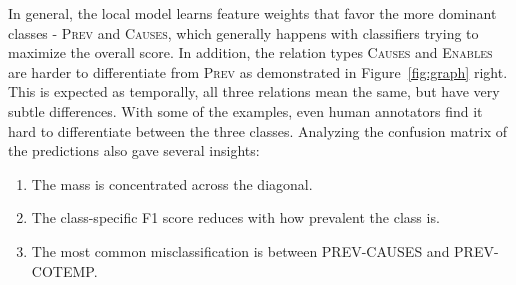 In general, the local model learns feature weights that favor the more dominant classes - \textsc{Prev} and \textsc{Causes}, which generally happens with classifiers trying to maximize the overall score. In addition, the relation types \textsc{Causes} and \textsc{Enables} are harder to differentiate from \textsc{Prev} as demonstrated in Figure~\ref{fig:graph} right. This is expected as temporally, all three relations mean the same, but have very subtle differences. With some of the examples, even human annotators find it hard to differentiate between the three classes. Analyzing the confusion matrix of the predictions also gave several insights:
\begin{enumerate}
\item The mass is concentrated across the diagonal.
\item The class-specific F1 score reduces with how prevalent the class is.
\item The most common misclassification is between PREV-CAUSES and PREV-COTEMP.
\end{enumerate}
